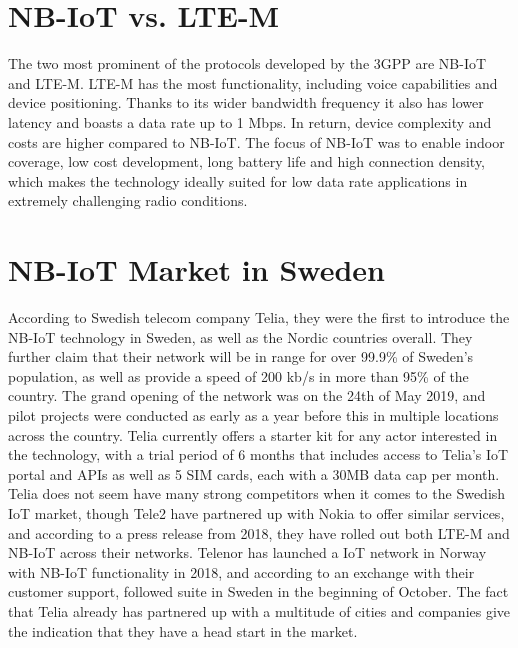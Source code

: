 \section{NB-IoT vs. LTE-M}
The two most prominent of the protocols developed by the 3GPP are NB-IoT and LTE-M. LTE-M has the most functionality, including voice capabilities and device positioning. Thanks to its wider bandwidth frequency it also has lower latency and boasts a data rate up to 1 Mbps.\cite{ericsson-blog} In return, device complexity and costs are higher compared to NB-IoT. The focus of NB-IoT was to enable indoor coverage, low cost development, long battery life and high connection density, which makes the technology ideally suited for low data rate applications in extremely challenging radio conditions. 

\section{NB-IoT Market in Sweden}
According to Swedish telecom company Telia, they were the first to introduce the NB-IoT technology in Sweden, as well as the Nordic countries overall.\cite{telia-nb} They further claim that their network will be in range for over 99.9\% of Sweden's population, as well as provide a speed of 200 kb/s in more than 95\% of the country.\cite{telia-first} The grand opening of the network was on the 24th of May 2019, and pilot projects were conducted as early as a year before this in multiple locations across the country. Telia currently offers a starter kit  for any actor interested in the technology, with a trial period of 6 months that includes access to Telia's IoT portal and APIs as well as 5 SIM cards, each with a 30MB data cap per month. Telia does not seem have many strong competitors when it comes to the Swedish IoT market, though Tele2 have partnered up with Nokia to offer similar services, and according to a press release from 2018, they have rolled out both LTE-M and NB-IoT across their networks.\cite{tele2-nokia} Telenor has launched a IoT network in Norway with NB-IoT functionality in 2018\cite{telenor-iot}, and according to an exchange with their customer support, followed suite in Sweden in the beginning of October. The fact that Telia already has partnered up with a multitude of cities and companies give the indication that they have a head start in the market.